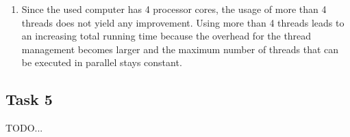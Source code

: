 \documentclass[a4paper, DIV12, headsepline]{scrartcl}
\begin{document}
\begin{enumerate}[label=\alph*)]
\item Since the used computer has 4 processor cores, the usage of more than 4 threads does not yield any improvement. Using more than 4 threads leads to an increasing total running time because the overhead for the thread management becomes larger and the maximum number of threads that can be executed in parallel stays constant.

\end{enumerate}








\subsection*{Task 5}
TODO...

\end{document}
